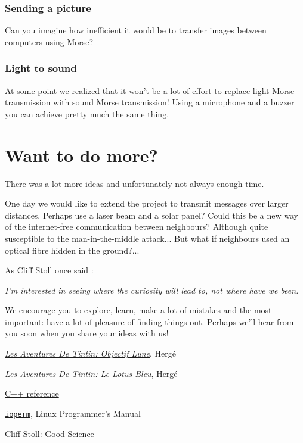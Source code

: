 \documentclass[12pt]{report}
\begin{document}
\subsubsection{Sending a picture}

Can you imagine how inefficient it would be to transfer images between computers using Morse?

\subsubsection{Light to sound}

At some point we realized that it won't be a lot of effort to replace light Morse transmission with sound Morse transmission! Using a microphone and a buzzer you can achieve pretty much the same thing.

\section{Want to do more?}

There was a lot more ideas and unfortunately not always enough time.

One day we would like to extend the project to transmit messages over larger distances. Perhaps use a laser beam and a solar panel? Could this be a new way of the internet-free communication between neighbours? Although quite susceptible to the man-in-the-middle attack... But what if neighbours used an optical fibre hidden in the ground?...

As Cliff Stoll once said \cite{cliff_stoll}: 

\textit{I'm interested in seeing where the curiosity will lead to, not where have we been.}

We encourage you to explore, learn, make a lot of mistakes and the most important: have a lot of pleasure of finding things out. Perhaps we'll hear from you soon when you share your ideas with us!


\begin{thebibliography}{50}

 \hyperlink{https://fr.wikipedia.org/wiki/Objectif_Lune}{\textit{Les Aventures De Tintin: Objectif Lune}}, Hergé

 \hyperlink{https://fr.wikipedia.org/wiki/Le_Lotus_bleu}{\textit{Les Aventures De Tintin: Le Lotus Bleu}}, Hergé

 \hyperlink{http://www.cplusplus.com/reference/}{C++ reference}

 \hyperlink{http://man7.org/linux/man-pages/man2/ioperm.2.html}{\texttt{ioperm}}, Linux Programmer's Manual

 \hyperlink{https://www.youtube.com/watch?v=xHEIOgONq6A}{Cliff Stoll: Good Science}



\end{thebibliography}
\end{document}
